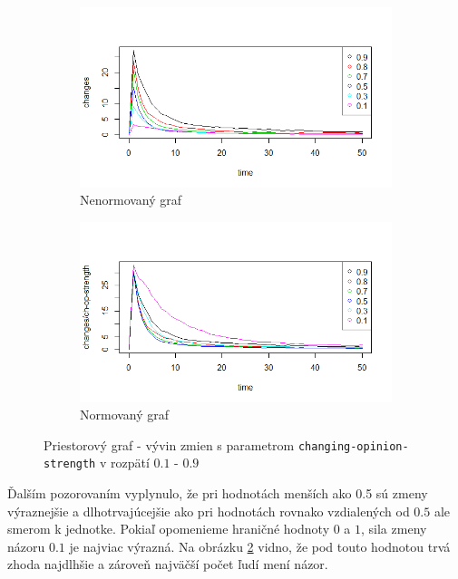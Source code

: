 \documentclass[10pt,a4paper]{report}
\begin{document}
\begin{figure}
\begin{subfigure}{.5\textwidth}
  \centering
  \includegraphics[width=1\linewidth]{plots/spatial-g/spatialChanges1-9.png}
  \caption{Nenormovaný graf}
  \label{fig:zmeny-nenormovany}
\end{subfigure}%
\begin{subfigure}{.5\textwidth}
  \centering
  
  \includegraphics[width=1\linewidth]{plots/spatial-g/spatialChanges1-9norm.png}
  \caption{Normovaný graf}
  \label{fig:zmeny-normovany}
\end{subfigure}
\caption{Priestorový graf - vývin zmien s parametrom \texttt{changing-opinion-strength} v rozpätí $0.1$ - $0.9$}
\label{fig:zmeny-nenormovany-normovany}
\end{figure}


Ďalším pozorovaním vyplynulo, že pri hodnotách menších ako 0.5 sú zmeny výraznejšie a dlhotrvajúcejšie ako pri hodnotách rovnako vzdialených od $0.5$ ale smerom k jednotke. Pokiaľ opomenieme hraničné hodnoty $0$ a $1$, sila zmeny názoru $0.1$ je najviac výrazná. Na obrázku \ref{fig:zmeny-normovany} vidno, že pod touto hodnotou trvá zhoda najdlhšie a zároveň najväčší počet ľudí mení názor.
\end{document}
